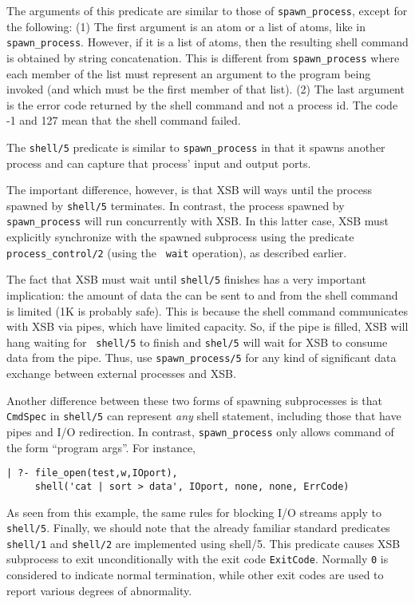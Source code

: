 \begin{description}
    The arguments of this predicate are similar to those of
    \verb|spawn_process|, except for the following:
    (1) The first argument is an atom or a list of atoms, like in
    \verb|spawn_process|. However, if it is a list of atoms, then the
    resulting shell command is obtained by string concatenation. This is
    different from \verb|spawn_process| where each member of the list must
    represent an argument to the program being invoked (and which must be
    the first member of that list).  (2) The last argument is the error
    code returned by the shell command and not a process id. The code -1
    and 127 mean that the shell command failed.
    
    The {\tt shell/5} predicate is similar to \verb|spawn_process| in that
    it spawns another process and can capture that process' input and
    output ports.
    
    The important difference, however, is that XSB will ways until the
    process spawned by {\tt shell/5} terminates. In contrast, the process
    spawned by \verb|spawn_process| will run concurrently with XSB.  In
    this latter case, XSB must explicitly synchronize with the spawned
    subprocess using the predicate \verb|process_control/2| (using the {\tt
      wait} operation), as described earlier.
    
    The fact that XSB must wait until {\tt shell/5} finishes has a very
    important implication: the amount of data the can be sent to and from
    the shell command is limited (1K is probably safe). This is because the
    shell command communicates with XSB via pipes, which have limited
    capacity.  So, if the pipe is filled, XSB will hang waiting for {\tt
      shell/5} to finish and {\tt shel/5} will wait for XSB to consume data
    from the pipe.  Thus, use \verb|spawn_process/5| for any kind of
    significant data exchange between external processes and XSB.
  
  Another difference between these two forms of spawning subprocesses is
  that {\tt CmdSpec} in {\tt shell/5} can represent \emph{any} shell
  statement, including those that have pipes and I/O redirection. In
  contrast, \verb|spawn_process| only allows command of the form ``program
  args''. For instance,
\begin{verbatim}
| ?- file_open(test,w,IOport),
     shell('cat | sort > data', IOport, none, none, ErrCode)
\end{verbatim}
As seen from this example, the same rules for blocking I/O streams
apply to {\tt shell/5}. Finally, we should note that the already familiar
standard predicates {\tt shell/1} and {\tt shell/2} are implemented using
shell/5.
This predicate causes XSB subprocess to exit unconditionally with the exit
code {\tt ExitCode}. Normally {\tt 0} is considered to indicate normal
termination, while other exit codes are used to report various degrees of
abnormality.


\end{description}
